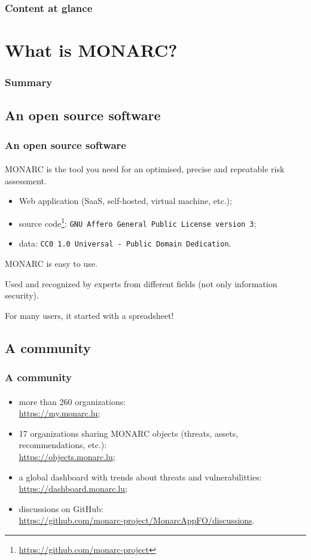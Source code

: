\setcounter{tocdepth}{1}
\begin{frame}
  \frametitle{Content at glance}
  \tableofcontents
\end{frame}
\setcounter{tocdepth}{4}

%
%
\section{What is MONARC?}
\begin{frame}
  \frametitle{Summary}
\end{frame}
\subsection{An open source software}
\begin{frame}
  \frametitle{An open source software}
  \framesubtitle{}
  MONARC is the tool you need for an optimised, precise and repeatable risk assessment.

  \bigskip
  \begin{itemize}
    \item Web application (SaaS, self-hosted, virtual machine, etc.);
    \item source code\footnote{\url{https://github.com/monarc-project}}:
    \texttt{GNU Affero General Public License version 3};
    \item data: \texttt{CC0 1.0 Universal - Public Domain Dedication}.
  \end{itemize}

  \bigskip
  MONARC is easy to use.

  Used and recognized by experts from different fields (not only information security).

  \bigskip
  For many users, it started with a spreadsheet!
\end{frame}

\subsection{A community}
\begin{frame}
  \frametitle{A community}
  \framesubtitle{}
  \begin{itemize}
    \item more than 260 organizations:\\ \url{https://my.monarc.lu};
    \item 17 organizations sharing MONARC objects (threats, assets, recommendations, etc.):\\
    \url{https://objects.monarc.lu};
    \item a global dashboard with trends about threats and vulnerabilitties:\\
    \url{https://dashboard.monarc.lu};
    \item discussions on GitHub:\\
    \url{https://github.com/monarc-project/MonarcAppFO/discussions}.
  \end{itemize}
\end{frame}

